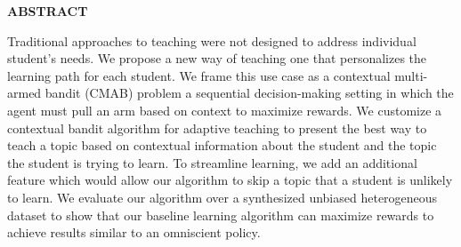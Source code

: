 \newpage
{}


\begin{center}
\textbf{ABSTRACT}
\end{center}

Traditional approaches to teaching were not designed to address individual student's needs. We propose a new way of teaching one that personalizes the learning path for each student. We frame this use case as a contextual multi-armed bandit (CMAB) problem a sequential decision-making setting in which the agent must pull an arm based on context to maximize rewards. We customize a contextual bandit algorithm for adaptive teaching to present the best way to teach a topic based on contextual information about the student and the topic the student is trying to learn. To streamline learning, we add an additional feature which would allow our algorithm to skip a topic that a student is unlikely to learn. We evaluate our algorithm over a synthesized unbiased heterogeneous dataset to show that our baseline learning algorithm can maximize rewards to achieve results similar to an omniscient policy.